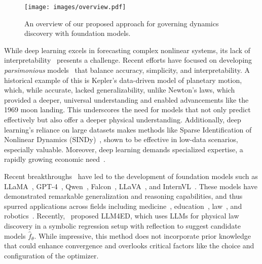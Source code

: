 \documentclass{article}
\begin{document}
\begin{figure*}[t]
    \centering
    \texttt{[image: images/overview.pdf]}
    \caption{An overview of our proposed approach for governing dynamics discovery with foundation models.}
    \label{fig:method-overview}
\end{figure*}

While deep learning excels in forecasting complex nonlinear systems, its lack of interpretability~\cite{Chakraborty17} presents a challenge. 
Recent efforts have focused on developing \textit{parsimonious} models~\cite{Bongard07, Schmidt09, Brunton2016} that balance accuracy, simplicity, and interpretability. 
A historical example of this is Kepler’s data-driven model of planetary motion, which, while accurate, lacked generalizability, unlike Newton’s laws, which provided a deeper, universal understanding and enabled advancements like the 1969 moon landing. 
This underscores the need for models that not only predict effectively but also offer a deeper physical understanding. 
Additionally, deep learning's reliance on large datasets makes methods like Sparse Identification of Nonlinear Dynamics (SINDy)~\cite{Brunton16b, kaiser2018sparse}, shown to be effective in low-data scenarios, especially valuable.
Moreover, deep learning demands specialized expertise, a rapidly growing economic need~\cite{ALEKSEEVA2021102002}.

Recent breakthroughs~\cite{Vaswani17} have led to the development of foundation models such as 
LLaMA~\cite{touvron2023}, 
GPT-4~\cite{openai2024gpt4technicalreport}, 
Qwen~\cite{bai2023}, 
Falcon~\cite{almazrouei2023}, 
LLaVA~\cite{liu2023improvedllava, liu2023llava}, and 
InternVL~\cite{chen2024}. 
These models have demonstrated remarkable generalization and reasoning capabilities, and thus spurred applications across fields including 
medicine~\cite{Moor2023}, 
education~\cite{Tianlong24}, 
law~\cite{henderson2023foundation}, and 
robotics~\cite{brohan2023can, mower2024ros}. 
Recently,~\citet{Mengge24} proposed LLM4ED, which uses LLMs for physical law discovery in a symbolic regression setup with reflection to suggest candidate models $\widehat{f}_\theta$. 
While impressive, this method does not incorporate prior knowledge that could enhance convergence and overlooks critical factors like the choice and configuration of the optimizer.
\end{document}
